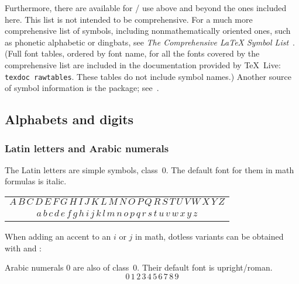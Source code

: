 Furthermore, there are  available
for \lat/ use above and beyond the ones included here. This list is not
intended to be comprehensive. For a much more comprehensive list of
symbols, including nonmathematically oriented ones, such as phonetic
alphabetic or dingbats, see \emph{The Comprehensive \LaTeX{} Symbol
List}~\cite{comprehensive}.  (Full font tables, ordered by font name,
for all the fonts covered by the comprehensive list are included in
the documentation provided by \TeX~Live: \texttt{texdoc rawtables}.
These tables do not include symbol names.)  Another source of symbol
information is the  package; see~\cite{uc-math}.



\subsection{Alphabets and digits\nopunct}\label{alpha-digit}

\subsubsection{Latin letters and Arabic numerals}
The Latin letters are simple symbols, class~0. The default font for them
in math formulas is italic.
\begin{center}
\begin{tabular}{c}
  $A\,B\,C\,D\,E\,F\,G\,H\,I\,J\,K\,L\,M%
   \,N\,O\,P\,Q\,R\,S\,T\,U\,V\,W\,X\,Y\,Z$\\
  $a\,b\,c\,d\,e\,f\,g\,h\,i\,j\,k\,l\,m%
   \,n\,o\,p\,q\,r\,s\,t\,u\,v\,w\,x\,y\,z$
\end{tabular}
\end{center}
When adding an accent to an $i$ or $j$ in math, dotless variants can be
obtained with  and :
\begin{symlist}
\symbox{\hat{\jmath}}{\string\hat\string{\string\jmath\string}}
\end{symlist}

Arabic numerals 0 are also of class~0. Their default font is
upright/roman.
\[0\,1\,2\,3\,4\,5\,6\,7\,8\,9\]

